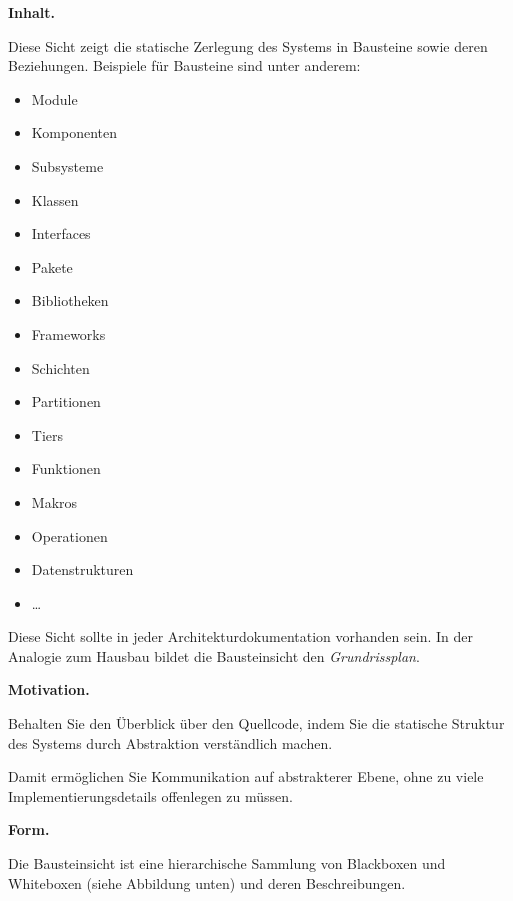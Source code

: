 \documentclass[]{article}
\begin{document}
\textbf{Inhalt.}

Diese Sicht zeigt die statische Zerlegung des Systems in Bausteine sowie
deren Beziehungen. Beispiele für Bausteine sind unter anderem:

\begin{itemize}
\item
  Module
\item
  Komponenten
\item
  Subsysteme
\item
  Klassen
\item
  Interfaces
\item
  Pakete
\item
  Bibliotheken
\item
  Frameworks
\item
  Schichten
\item
  Partitionen
\item
  Tiers
\item
  Funktionen
\item
  Makros
\item
  Operationen
\item
  Datenstrukturen
\item
  \ldots{}
\end{itemize}

Diese Sicht sollte in jeder Architekturdokumentation vorhanden sein. In
der Analogie zum Hausbau bildet die Bausteinsicht den
\emph{Grundrissplan}.

\textbf{Motivation.}

Behalten Sie den Überblick über den Quellcode, indem Sie die statische
Struktur des Systems durch Abstraktion verständlich machen.

Damit ermöglichen Sie Kommunikation auf abstrakterer Ebene, ohne zu
viele Implementierungsdetails offenlegen zu müssen.

\textbf{Form.}

Die Bausteinsicht ist eine hierarchische Sammlung von Blackboxen und
Whiteboxen (siehe Abbildung unten) und deren Beschreibungen.
\end{document}
